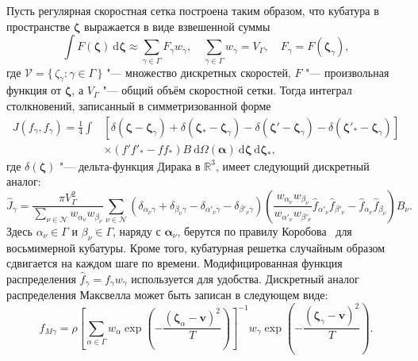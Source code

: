 \documentclass[
aps,%
12pt,%
final,%
notitlepage,%
oneside,%
onecolumn,%
nobibnotes,%
nofootinbib,%
superscriptaddress,%
noshowpacs,%
showkeys,%
centertags]%
{revtex4}
\newcommand{\dd}{\:\mathrm{d}}
\newcommand{\dzeta}{\boldsymbol{\dd\zeta}}
\newcommand{\bzeta}{\boldsymbol{\zeta}}
\newcommand{\Nu}{\mathcal{N}}
\newcommand{\Set}[2]{\{\,{#1}:{#2}\,\}}
\begin{document}
Пусть регулярная скоростная сетка построена таким образом,
что кубатура в пространстве \(\bzeta\) выражается в виде взвешенной суммы
\begin{equation}\label{eq:zeta_cubature}
    \int F(\bzeta) \dzeta \approx \sum_{\gamma\in\Gamma} F_\gamma w_\gamma,
        \quad \sum_{\gamma\in\Gamma} w_\gamma = V_\Gamma,
        \quad F_\gamma = F(\bzeta_\gamma),
\end{equation}
где \(\mathcal{V} = \Set{\zeta_\gamma}{\gamma\in\Gamma}\) "--- множество дискретных скоростей,
\(F\) "--- произвольная функция от \(\bzeta\),
а \(V_\Gamma\) "--- общий объём скоростной сетки.
Тогда интеграл столкновений, записанный в симметризованной форме
\begin{equation}\label{eq:symm_ci}
    \begin{aligned}
    J(f_\gamma, f_\gamma) = \frac14\int &\left[
        \delta(\bzeta-\bzeta_\gamma) + \delta(\bzeta_*-\bzeta_\gamma)
        - \delta(\bzeta'-\bzeta_\gamma) - \delta(\bzeta'_*-\bzeta_\gamma)\right] \\
        &\times(f'f'_* - ff_*)B \dd\Omega(\boldsymbol{\alpha}) \dzeta\dzeta_*,
    \end{aligned}
\end{equation}
где \(\delta(\bzeta)\) "--- дельта-функция Дирака в \(\mathbb{R}^3\),
имеет следующий дискретный аналог:
\begin{equation}\label{eq:discrete_symm_ci}
    \hat{J}_\gamma = \frac{\pi V_\Gamma^2}{\sum_{\nu\in\Nu} w_{\alpha_\nu}w_{\beta_\nu}}
        \sum_{\nu\in\Nu} \left(
            \delta_{\alpha_\nu\gamma} + \delta_{\beta_\nu\gamma}
            - \delta_{\alpha'_\nu\gamma} - \delta_{\beta'_\nu\gamma}
        \right)\left(
            \frac{w_{\alpha_\nu}w_{\beta_\nu}}{w_{\alpha'_\nu}w_{\beta'_\nu}}
            \hat{f}_{\alpha'_\nu}\hat{f}_{\beta'_\nu} - \hat{f}_{\alpha_\nu}\hat{f}_{\beta_\nu}
        \right)B_\nu.
\end{equation}
Здесь \(\alpha_\nu\in\Gamma\) и \(\beta_\nu\in\Gamma\), наряду с \(\boldsymbol{\alpha}_\nu\),
берутся по правилу Коробова~\cite{Korobov1959, Sloan1994} для восьмимерной кубатуры.
Кроме того, кубатурная решетка случайным образом сдвигается на каждом шаге по времени.
Модифицированная функция распределения \(\hat{f}_\gamma = f_\gamma w_\gamma\) используется для удобства.
Дискретный аналог распределения Максвелла может быть записан в следующем виде:
\begin{equation}\label{eq:discrete_Maxwell}
    \hat{f}_{M\gamma} = \rho\left[\sum_{\alpha\in\Gamma}w_\alpha\exp
            \left(-\frac{(\bzeta_\alpha - \boldsymbol{v})^2}{T}\right)
        \right]^{-1}
        w_\gamma\exp\left(-\frac{(\bzeta_\gamma - \boldsymbol{v})^2}{T}\right).
\end{equation}
\end{document}
